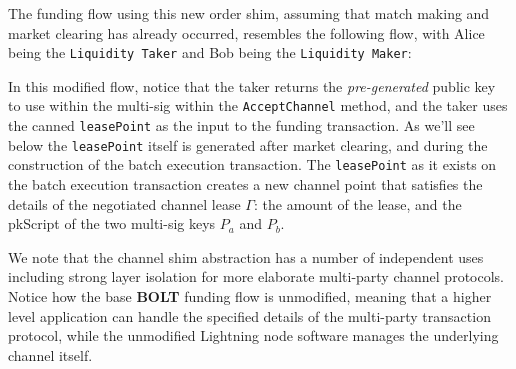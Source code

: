 \documentclass[10pt,a4paper]{article}
\theoremstyle{definition}
\begin{document}
The funding flow using this new order shim, assuming that match making and
market clearing has already occurred, resembles the following flow, with Alice
being the \texttt{Liquidity Taker} and Bob being the \texttt{Liquidity Maker}:
\begin{pcvstack}[boxed,center,space=1em]

\end{pcvstack} 

In this modified flow, notice that the taker returns the \emph{pre-generated}
public key to use within the multi-sig within the \texttt{AcceptChannel}
method, and the taker uses the canned \texttt{leasePoint} as the input to the
funding transaction. As we'll see below the \texttt{leasePoint} itself is
generated after market clearing, and during the construction of the batch
execution transaction. The \texttt{leasePoint} as it exists on the batch
execution transaction creates a new channel point that satisfies the details of
the negotiated channel lease $\Gamma$: the amount of the lease, and the
pkScript of the two multi-sig keys $P_a$ and $P_b$.

We note that the channel shim abstraction has a number of independent uses
including strong layer isolation for more elaborate multi-party channel
protocols. Notice how the base \textbf{BOLT} funding flow is unmodified,
meaning that a higher level application can handle the specified details of the
multi-party transaction protocol, while the unmodified Lightning node software
manages the underlying channel itself.
\end{document}
